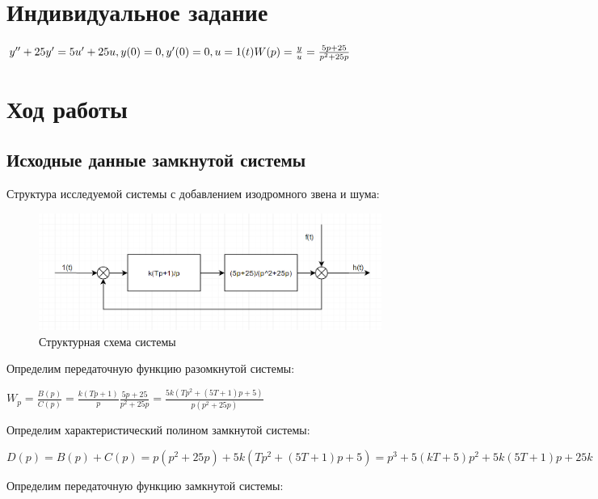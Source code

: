 \documentclass[14pt,a4paper,report]{report}
\begin{document}
\section{Индивидуальное задание}

$
\\
y''+25y'=5u'+25u, y(0)=0, y'(0)=0, u=1(t)\\\\
W(p)=\frac{y}{u}=\frac{5p+25}{p^2+25p}
$

\section{Ход работы}

\subsection{Исходные данные замкнутой системы}

Структура исследуемой системы с добавлением изодромного звена и шума:

\begin{figure}[h!]
	\centering
	\includegraphics[scale = 0.70]{images/schema.png}
	\caption{Структурная схема системы}
	\label{image:1}
\end{figure}

\clearpage

Определим передаточную функцию разомкнутой системы:

\begin{center}
$W_p=\frac{B(p)}{C(p)}=\frac{k(Tp+1)}{p}\frac{5p+25}{p^2+25p}=\frac{5k(Tp^2+(5T+1)p+5)}{p(p^2+25p)}$
\end{center}

Определим характеристический полином замкнутой системы:

\begin{center}
$D(p)=B(p)+C(p)=p(p^2+25p)+5k(Tp^2+(5T+1)p+5)=p^3+5(kT+5)p^2+5k(5T+1)p+25k$
\end{center}

Определим передаточную функцию замкнутой системы:
\end{document}
